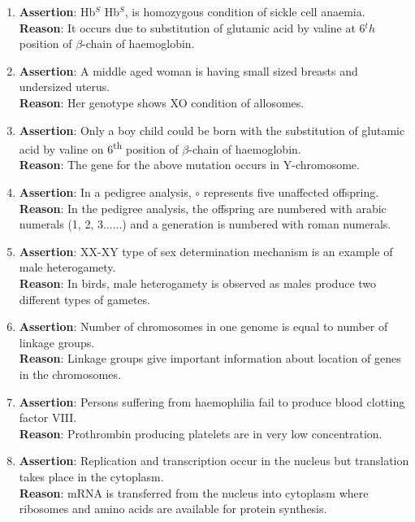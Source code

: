 \documentclass{article}
\begin{document}
\begin{enumerate}
    \item \textbf{Assertion}: Hb$^S$ Hb$^S$, is homozygous condition of sickle cell anaemia. \\
    \textbf{Reason}: It occurs due to substitution of glutamic acid by valine at 6$^th$ position of $\beta$-chain of haemoglobin.
    
    \item \textbf{Assertion}: A middle aged woman is having small sized breasts and undersized uterus. \\
    \textbf{Reason}: Her genotype shows XO condition of allosomes.
    
    \item \textbf{Assertion}: Only a boy child could be born with the substitution of glutamic acid by valine on 6\textsuperscript{th} position of $\beta$-chain of haemoglobin. \\
    \textbf{Reason}: The gene for the above mutation occurs in Y-chromosome.
    
    \item \textbf{Assertion}: In a pedigree analysis, $\circ$ represents five unaffected offspring. \\
    \textbf{Reason}: In the pedigree analysis, the offspring are numbered with arabic numerals (1, 2, 3......) and a generation is numbered with roman numerals.
    
    \item \textbf{Assertion}: XX-XY type of sex determination mechanism is an example of male heterogamety. \\
    \textbf{Reason}: In birds, male heterogamety is observed as males produce two different types of gametes.
    
    \item \textbf{Assertion}: Number of chromosomes in one genome is equal to number of linkage groups. \\
    \textbf{Reason}: Linkage groups give important information about location of genes in the chromosomes.
    
    \item \textbf{Assertion}: Persons suffering from haemophilia fail to produce blood clotting factor VIII. \\
    \textbf{Reason}: Prothrombin producing platelets are in very low concentration.
    
    \item \textbf{Assertion}: Replication and transcription occur in the nucleus but translation takes place in the cytoplasm. \\
    \textbf{Reason}: mRNA is transferred from the nucleus into cytoplasm where ribosomes and amino acids are available for protein synthesis.
\end{enumerate}
\end{document}
